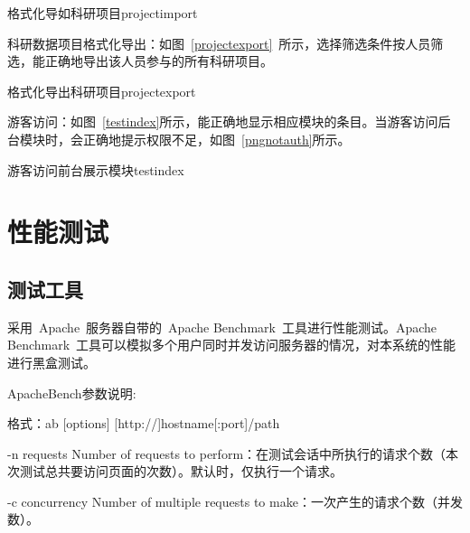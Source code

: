 \begin{pics}[H]{格式化导如科研项目}{projectimport}
\end{pics}

科研数据项目格式化导出：如图~\ref{projectexport}~所示，选择筛选条件按人员筛选，能正确地导出该人员参与的所有科研项目。

\begin{pics}[H]{格式化导出科研项目}{projectexport}
\end{pics}

游客访问：如图~\ref{testindex}所示，能正确地显示相应模块的条目。当游客访问后台模块时，会正确地提示权限不足，如图~\ref{pngnotauth}所示。

\begin{pics}[H]{游客访问前台展示模块}{testindex}
\end{pics}


\section{性能测试}

\subsection{测试工具}
采用~Apache~服务器自带的~Apache Benchmark~工具进行性能测试。Apache Benchmark~工具可以模拟多个用户同时并发访问服务器的情况，对本系统的性能进行黑盒测试。

ApacheBench参数说明:

格式：ab [options] [http://]hostname[:port]/path

-n requests Number of requests to perform：在测试会话中所执行的请求个数（本次测试总共要访问页面的次数）。默认时，仅执行一个请求。

-c concurrency Number of multiple requests to make：一次产生的请求个数（并发数）。


